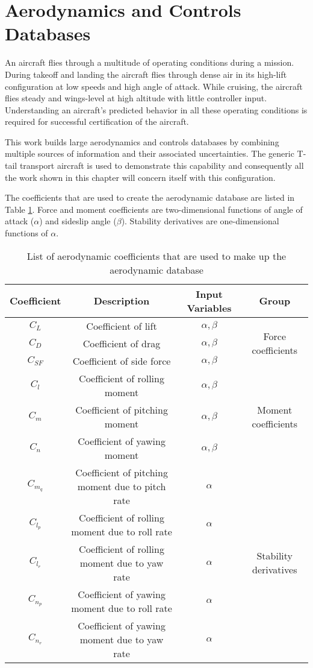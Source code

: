 \section{Aerodynamics and Controls Databases}

An aircraft flies through a multitude of operating conditions during a mission. During takeoff and landing the aircraft flies through dense air in its high-lift configuration at low speeds and high angle of attack. While cruising, the aircraft flies steady and wings-level at high altitude with little controller input. Understanding an aircraft's predicted behavior in all these operating conditions is required for successful certification of the aircraft. 

This work builds large aerodynamics and controls databases by combining multiple sources of information and their associated uncertainties. The generic T-tail transport aircraft is used to demonstrate this capability and consequently all the work shown in this chapter will concern itself with this configuration.

The coefficients that are used to create the aerodynamic database are listed in Table \ref{tab:aero_db}. Force and moment coefficients are two-dimensional functions of angle of attack ($\alpha$) and sideslip angle ($\beta$). Stability derivatives are one-dimensional functions of $\alpha$. 
\begin{table}[]
    \renewcommand{\arraystretch}{1.2}
    \centering
    \begin{tabular}{ c|c|c|c } 
         Coefficient & Description & Input Variables & Group \\ 
         \hline
         $C_L$ & Coefficient of lift & $\alpha, \beta$  & \multirow{3}{5em}{Force coefficients}\\ 
         $C_D$ & Coefficient of drag & $\alpha, \beta$  \\
         $C_{SF}$ & Coefficient of side force & $\alpha, \beta$  \\ \hline
         $C_l$ & Coefficient of rolling moment & $\alpha, \beta$  & \multirow{3}{5em}{Moment coefficients} \\
         $C_m$ & Coefficient of pitching moment & $\alpha, \beta$  \\
         $C_n$ & Coefficient of yawing moment & $\alpha, \beta$  \\ \hline
         $C_{m_q}$ & Coefficient of pitching moment due to pitch rate & $\alpha$  & \multirow{5}{5em}{Stability derivatives}\\
         $C_{l_p}$ & Coefficient of rolling moment due to roll rate & $\alpha$ \\
         $C_{l_r}$ & Coefficient of rolling moment due to yaw rate & $\alpha$ \\
         $C_{n_p}$ & Coefficient of yawing moment due to roll rate & $\alpha$ \\
         $C_{n_r}$ & Coefficient of yawing moment due to yaw rate & $\alpha$
         \\
    \end{tabular}
    \caption{List of aerodynamic coefficients that are used to make up the aerodynamic database}
    \label{tab:aero_db}
\end{table}

